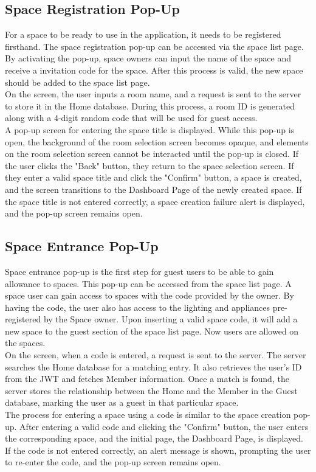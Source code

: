 \documentclass[conference]{IEEEtran}
\begin{document}
    \subsection{Space Registration Pop-Up}
        For a space to be ready to use in the application, it needs to be registered firsthand. The space registration pop-up can be accessed via the space list page. By activating the pop-up, space owners can input the name of the space and receive a invitation code for the space. After this process is valid, the new space should be added to the space list page.\\
        On the screen, the user inputs a room name, and a request is sent to the server to store it in the Home database. During this process, a room ID is generated along with a 4-digit random code that will be used for guest access. \\
        A pop-up screen for entering the space title is displayed. While this pop-up is open, the background of the room selection screen becomes opaque, and elements on the room selection screen cannot be interacted until the pop-up is closed. If the user clicks the "Back" button, they return to the space selection screen. If they enter a valid space title and click the "Confirm" button, a space is created, and the screen transitions to the Dashboard Page of the newly created space. If the space title is not entered correctly, a space creation failure alert is displayed, and the pop-up screen remains open.
    \subsection{Space Entrance Pop-Up}
        Space entrance pop-up is the first step for guest users to be able to gain allowance to spaces. This pop-up can be accessed from the space list page.  A space user can gain access to spaces with the code provided by the owner. By having the code, the user also has access to the lighting and appliances pre-registered by the Space owner. Upon inserting a valid space code, it will add a new space to the guest section of the space list page. Now users are allowed on the spaces.\\
        On the screen, when a code is entered, a request is sent to the server. The server searches the Home database for a matching entry. It also retrieves the user's ID from the JWT and fetches Member information. Once a match is found, the server stores the relationship between the Home and the Member in the Guest database, marking the user as a guest in that particular space.\\
        The process for entering a space using a code is similar to the space creation pop-up. After entering a valid code and clicking the "Confirm" button, the user enters the corresponding space, and the initial page, the Dashboard Page, is displayed. If the code is not entered correctly, an alert message is shown, prompting the user to re-enter the code, and the pop-up screen remains open.
\end{document}
